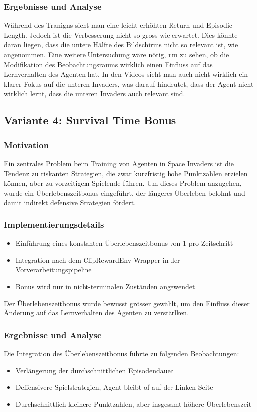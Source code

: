 \documentclass{article}
\begin{document}
\subsubsection{Ergebnisse und Analyse}
Während des Tranigns sieht man eine leicht erhöhten Return und Episodic Length. Jedoch ist die Verbesserung nicht so gross wie erwartet. Dies könnte daran liegen, dass die untere Hälfte des Bildschirms nicht so relevant ist, wie angenommen. Eine weitere Untersuchung wäre nötig, um zu sehen, ob die Modifikation des Beobachtungsraums wirklich einen Einfluss auf das Lernverhalten des Agenten hat.
In den Videos sieht man auch nicht wirklich ein klarer Fokus auf die unteren Invaders, was darauf hindeutet, dass der Agent nicht wirklich lernt, dass die unteren Invaders auch relevant sind.



\subsection{Variante 4: Survival Time Bonus}
\subsubsection{Motivation}
Ein zentrales Problem beim Training von Agenten in Space Invaders ist die Tendenz zu riskanten Strategien, die zwar kurzfristig hohe Punktzahlen erzielen können, aber zu vorzeitigem Spielende führen. Um dieses Problem anzugehen, wurde ein Überlebenszeitbonus eingeführt, der längeres Überleben belohnt und damit indirekt defensive Strategien fördert.

\subsubsection{Implementierungsdetails}
\begin{itemize}
    \item Einführung eines konstanten Überlebenszeitbonus von 1 pro Zeitschritt
    \item Integration nach dem ClipRewardEnv-Wrapper in der Vorverarbeitungspipeline
    \item Bonus wird nur in nicht-terminalen Zuständen angewendet
\end{itemize}

Der Überlebenszeitbonus wurde bewusst grösser gewählt, um den Einfluss dieser Änderung auf das Lernverhalten des Agenten zu verstärlken.


\subsubsection{Ergebnisse und Analyse}
Die Integration des Überlebenszeitbonus führte zu folgenden Beobachtungen:
\begin{itemize}
    \item Verlängerung der durchschnittlichen Episodendauer
    \item Deffensivere Spielstrategien, Agent bleibt of auf der Linken Seite
    \item Durchschnittlich kleinere Punktzahlen, aber insgesamt höhere Überlebenszeit
\end{itemize}
\end{document}
